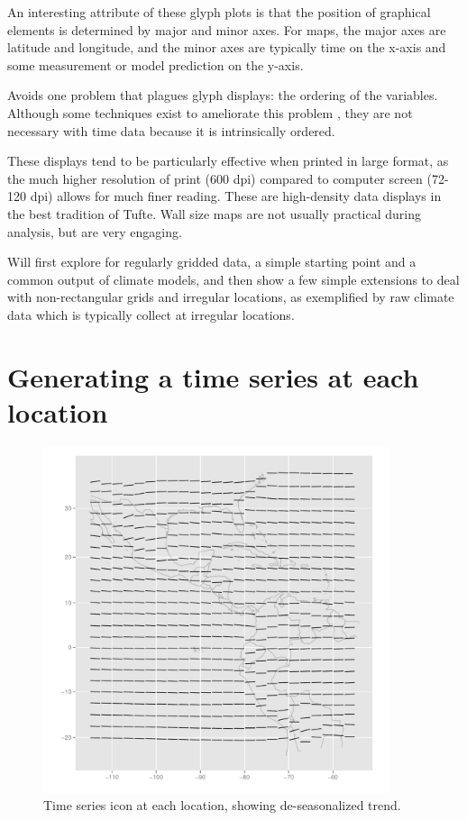 \documentclass[oneside]{article}
\begin{document}
An interesting attribute of these glyph plots is that the position of graphical elements is determined by major and minor axes. For maps, the major axes are latitude and longitude, and the minor axes are typically time on the x-axis and some measurement or model prediction on the y-axis.

Avoids one problem that plagues glyph displays: the ordering of the variables. Although some techniques exist to ameliorate this problem \citep{kleiner:1981,hurley:2010}, they are not necessary with time data because it is intrinsically ordered.

These displays tend to be particularly effective when printed in large format, as the much higher resolution of print (600 dpi) compared to computer  screen (72-120 dpi) allows for much finer reading. These are high-density data displays in the best tradition of Tufte. Wall size maps are not usually practical during analysis, but are very engaging.

Will first explore for regularly gridded data, a simple starting point and a common output of climate models, and then show a few simple extensions to deal with non-rectangular grids and irregular locations, as exemplified by raw climate data which is typically collect at irregular locations.
\section{Generating a time series at each location}

\begin{figure}[htp]
\centerline{\includegraphics[width=4in]{nasa-deseas-trend.pdf}}
\caption{Time series icon at each location, showing de-seasonalized trend.}
\end{figure}
\end{document}
